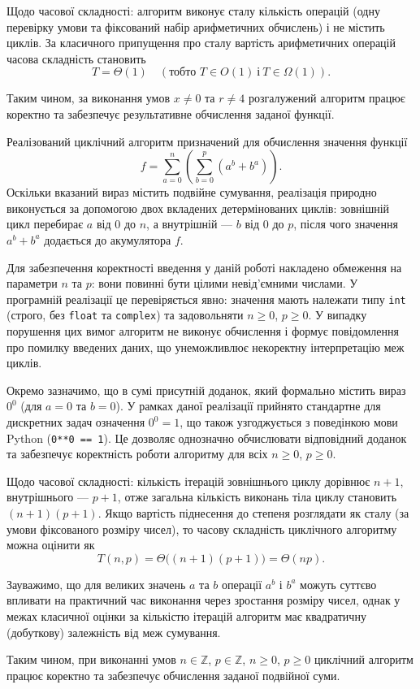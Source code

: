 \documentclass[12pt,a4paper]{article}
\begin{document}
    Щодо часової складності: алгоритм виконує сталу кількість операцій (одну перевірку умови та фіксований набір арифметичних обчислень) і не містить циклів. За класичного припущення про сталу вартість арифметичних операцій часова складність становить
    \[
    T=\Theta(1)\quad (\text{тобто } T\in O(1)\ \text{і}\ T\in \Omega(1)).
    \]

    Таким чином, за виконання умов $x \neq 0$ та $r \neq 4$ розгалужений алгоритм працює коректно та забезпечує результативне обчислення заданої функції.

    Реалізований циклічний алгоритм призначений для обчислення значення функції
    \[
    f=\sum_{a=0}^{n}\left(\sum_{b=0}^{p}\left(a^{b}+b^{a}\right)\right).
    \]
    Оскільки вказаний вираз містить подвійне сумування, реалізація природно виконується за допомогою двох вкладених детермінованих циклів: зовнішній цикл перебирає $a$ від $0$ до $n$, а внутрішній — $b$ від $0$ до $p$, після чого значення $a^{b}+b^{a}$ додається до акумулятора $f$.

    Для забезпечення коректності введення у даній роботі накладено обмеження на параметри $n$ та $p$: вони повинні бути цілими невід’ємними числами. У програмній реалізації це перевіряється явно: значення мають належати типу \texttt{int} (строго, без \texttt{float} та \texttt{complex}) та задовольняти $n\ge 0$, $p\ge 0$. У випадку порушення цих вимог алгоритм не виконує обчислення і формує повідомлення про помилку введених даних, що унеможливлює некоректну інтерпретацію меж циклів.

    Окремо зазначимо, що в сумі присутній доданок, який формально містить вираз $0^{0}$ (для $a=0$ та $b=0$). У рамках даної реалізації прийнято стандартне для дискретних задач означення $0^{0}=1$, що також узгоджується з поведінкою мови Python (\texttt{0**0 == 1}). Це дозволяє однозначно обчислювати відповідний доданок та забезпечує коректність роботи алгоритму для всіх $n\ge 0$, $p\ge 0$.

    Щодо часової складності: кількість ітерацій зовнішнього циклу дорівнює $n+1$, внутрішнього — $p+1$, отже загальна кількість виконань тіла циклу становить $(n+1)(p+1)$. Якщо вартість піднесення до степеня розглядати як сталу (за умови фіксованого розміру чисел), то часову складність циклічного алгоритму можна оцінити як
\[
T(n,p)=\Theta\big((n+1)(p+1)\big)=\Theta(np).
\]

Зауважимо, що для великих значень $a$ та $b$ операції $a^{b}$ і $b^{a}$ можуть суттєво впливати на практичний час виконання через зростання розміру чисел, однак у межах класичної оцінки за кількістю ітерацій алгоритм має квадратичну (добуткову) залежність від меж сумування.

Таким чином, при виконанні умов $n\in\mathbb{Z}$, $p\in\mathbb{Z}$, $n\ge 0$, $p\ge 0$ циклічний алгоритм працює коректно та забезпечує обчислення заданої подвійної суми.
\end{document}
